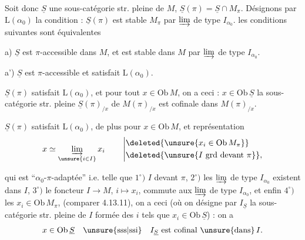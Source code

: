 Soit donc $\underline S$ une sous-catégorie str. pleine de $M$, $\underline S(\pi)=\underline S\cap M_\pi$. Désignons par $\mathrm L(\alpha_0)$ la condition : $\underline S(\pi)$ est stable   $M_\pi$ par $\varinjlim$ de type $I_{\alpha_0}$.   les conditions suivantes sont équivalentes

a) $\underline S$ est $\pi$-accessible dans $M$, et  est stable dans $M$ par $\varinjlim$ de type $I_{\alpha_0}$.

a') $\underline S$ est $\pi$-accessible et  satisfait $\mathrm L(\alpha_0)$.

 $\underline S(\pi)$ satisfait $\mathrm L(\alpha_0)$, et pour tout $x\in\mathrm{Ob}\,M$,  on a ceci : $x\in\mathrm{Ob}\,\underline S$  la sous-catégorie str. pleine $\underline S(\pi)_{/x}$  de $M(\pi)_{/x}$ est cofinale dans $M(\pi)_{/x}$.

 $\underline S(\pi)$ satisfait $\mathrm L(\alpha_0)$, de plus pour  $x\in\mathrm{Ob}\,M$, et  représentation
\[
 x\simeq\varinjlim_{\unsure{i\in I}}x_i\qquad
 \left|\begin{aligned}
 &\deleted{\unsure{x_i\in\mathrm{Ob}\,M_\pi}}\\
 &\deleted{\unsure{I\text{ grd devant }\pi}},\end{aligned}\right.
\]



qui est ``$\alpha_0$-$\pi$-adaptée'' i.e. telle que   $1^\circ)$ $I$   devant $\pi$, $2^\circ)$ les $\varinjlim$ de type $I_{\alpha_0}$ existent dans $I$, $3^\circ)$ le foncteur $I\longrightarrow M$, $i\mapsto x_i$, commute aux $\varinjlim$ de type $I_{\alpha_0}$, et enfin $4^\circ)$ les $x_i\in\mathrm{Ob}\,M_\pi$, (comparer 4.13.11), on a ceci (où on désigne par $I_{\underline S}$ la sous-catégorie str. pleine de $I$ formée des $i$ tels que $x_i\in\mathrm{Ob}\,\underline S$) : on a
\[
 x\in\mathrm{Ob}\,\underline S\quad\text{\unsure{sss|ssi}}\quad I_{\underline S}\text{ est cofinal }\unsure{\text{dans}}\,I.
\]

